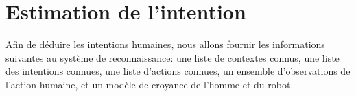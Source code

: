 \documentclass[a4paper,11pt,twoside]{StyleThese}
\begin{document}



\section{Estimation de l'intention}
\label{sec:intention_recognition}
Afin de déduire les intentions humaines, nous allons fournir les informations suivantes au système de reconnaissance: une liste de contextes connus, une liste des intentions connues, une liste d'actions connues, un ensemble d'observations de l'action humaine, et un modèle de croyance de l'homme et du robot.
\end{document}
